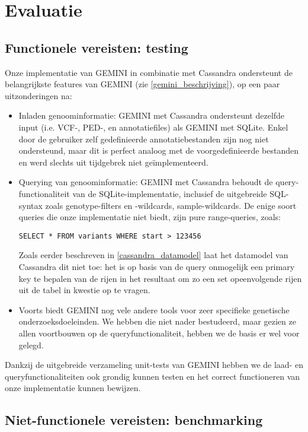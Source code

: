 \chapter{Evaluatie}

\section{Functionele vereisten: testing}

Onze implementatie van GEMINI in combinatie met Cassandra ondersteunt de belangrijkste features van GEMINI (zie \ref{gemini_beschrijving}), op een paar uitzonderingen na:
\begin{itemize}
\item Inladen genoominformatie: GEMINI met Cassandra ondersteunt dezelfde input (i.e. VCF-, PED-, en annotatiefiles) als GEMINI met SQLite. Enkel door de gebruiker zelf gedefinieerde annotatiebestanden zijn nog niet ondersteund, maar dit is perfect analoog met de voorgedefinieerde bestanden en werd slechts uit tijdgebrek niet ge\"implementeerd.
\item Querying van genoominformatie: GEMINI met Cassandra behoudt de query-functionaliteit van de SQLite-implementatie, inclusief de uitgebreide SQL-syntax zoals genotype-filters en -wildcards, sample-wildcards. De enige soort queries die onze implementatie niet biedt, zijn pure range-queries, zoals:

\texttt{SELECT * FROM variants WHERE start > 123456}

Zoals eerder beschreven in \ref{cassandra_datamodel} laat het datamodel van Cassandra dit niet toe: het is op basis van de query onmogelijk een primary key te bepalen van de rijen in het resultaat om zo een set opeenvolgende rijen uit de tabel in kwestie op te vragen.
\item Voorts biedt GEMINI nog vele andere tools voor zeer specifieke genetische onderzoeksdoeleinden. We hebben die niet nader bestudeerd, maar gezien ze allen voortbouwen op de queryfunctionaliteit, hebben we de basis er wel voor gelegd.
\end{itemize}

Dankzij de uitgebreide verzameling unit-tests van GEMINI hebben we de laad- en queryfunctionaliteiten ook grondig kunnen testen en het correct functioneren van onze implementatie kunnen bewijzen.

\section{Niet-functionele vereisten: benchmarking}

